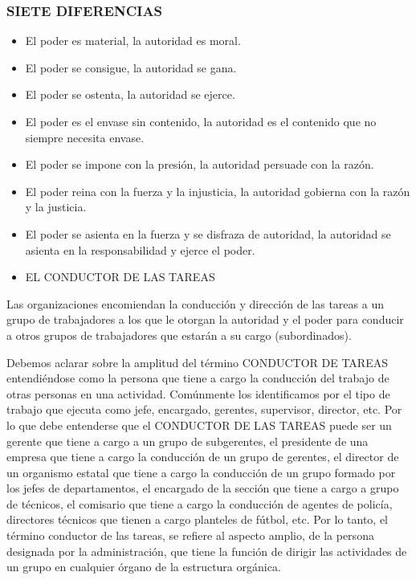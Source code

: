 \subsubsection*{SIETE DIFERENCIAS}
\begin{itemize}
  \item El poder es material, la autoridad es moral.
  \item El poder se consigue, la autoridad se gana.
  \item El poder se ostenta, la autoridad se ejerce.
  \item El poder es el envase sin contenido, la autoridad es el contenido que no siempre necesita envase.
  \item El poder se impone con la presión, la autoridad persuade con la razón.
  \item El poder reina con la fuerza y la injusticia, la autoridad gobierna con la razón y la justicia.
  \item El poder se asienta en la fuerza y se disfraza de autoridad, la autoridad se asienta en la responsabilidad y ejerce el poder.
  \item EL CONDUCTOR DE LAS TAREAS
\end{itemize}
Las organizaciones encomiendan la conducción y dirección de las tareas a un grupo de trabajadores a los que le otorgan la autoridad y el poder para conducir a otros grupos de trabajadores que estarán a su cargo (subordinados).

Debemos aclarar sobre la amplitud del término CONDUCTOR DE TAREAS entendiéndose como la persona que tiene a cargo la conducción del trabajo de otras personas en una actividad. Comúnmente los identificamos por el tipo de trabajo que ejecuta como jefe, encargado, gerentes, supervisor, director, etc. Por lo que debe entenderse que el CONDUCTOR DE LAS TAREAS puede ser un gerente que tiene a cargo a un grupo de subgerentes, el presidente de una empresa que tiene a cargo la conducción de un grupo de gerentes, el director de un organismo estatal que tiene a cargo la conducción de un grupo formado por los jefes de departamentos, el encargado de la sección que tiene a cargo a grupo de técnicos, el comisario que tiene a cargo la conducción de agentes de policía, directores técnicos que tienen a cargo planteles de fútbol, etc. Por lo tanto, el término conductor de las tareas, se refiere al aspecto amplio, de la persona designada por la administración, que tiene la función de dirigir las actividades de un grupo en cualquier órgano de la estructura orgánica.

